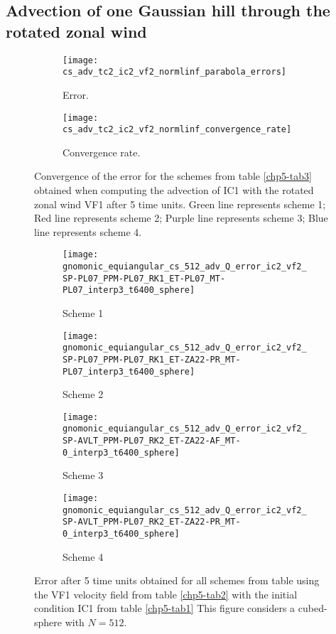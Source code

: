 \subsection{Advection of one Gaussian hill through the rotated zonal wind}
\begin{figure}[!htb]
	\centering
	\begin{subfigure}{0.42\textwidth}
		\centering
		\texttt{[image: cs\_adv\_tc2\_ic2\_vf2\_normlinf\_parabola\_errors]}
		\caption{Error.\label{chp5-adv1-error}}
	\end{subfigure}
	\begin{subfigure}{0.42\textwidth}
		\centering
		\texttt{[image: cs\_adv\_tc2\_ic2\_vf2\_normlinf\_convergence\_rate]}
		\caption{Convergence rate.\label{chp5-adv1-cr}}
	\end{subfigure}
	\caption{Convergence of the error for the schemes from table \ref{chp5-tab3} obtained when computing the advection of IC1  with the rotated zonal wind VF1 after 5 time units.
	Green line represents scheme 1;
	Red line represents scheme 2;
	Purple line represents scheme 3;
	Blue line represents scheme 4.
	\label{chp5-error-adv1}}
\end{figure}

\begin{figure}[!htb]
	\centering
	\begin{subfigure}{0.3\textwidth}
		\centering
		\texttt{[image: gnomonic\_equiangular\_cs\_512\_adv\_Q\_error\_ic2\_vf2\_SP-PL07\_PPM-PL07\_RK1\_ET-PL07\_MT-PL07\_interp3\_t6400\_sphere]}
		\caption{Scheme 1 \label{chp5-adv1-s1}}
	\end{subfigure}
	\begin{subfigure}{0.3\textwidth}
		\centering
		\texttt{[image: gnomonic\_equiangular\_cs\_512\_adv\_Q\_error\_ic2\_vf2\_SP-PL07\_PPM-PL07\_RK1\_ET-ZA22-PR\_MT-PL07\_interp3\_t6400\_sphere]}
		\caption{Scheme 2 \label{chp5-adv1-s2}}
	\end{subfigure}

	\begin{subfigure}{0.3\textwidth}
	\centering
	\texttt{[image: gnomonic\_equiangular\_cs\_512\_adv\_Q\_error\_ic2\_vf2\_SP-AVLT\_PPM-PL07\_RK2\_ET-ZA22-AF\_MT-0\_interp3\_t6400\_sphere]}
	\caption{Scheme 3 \label{chp5-adv1-s3}}
\end{subfigure}
\begin{subfigure}{0.3\textwidth}
	\centering
	\texttt{[image: gnomonic\_equiangular\_cs\_512\_adv\_Q\_error\_ic2\_vf2\_SP-AVLT\_PPM-PL07\_RK2\_ET-ZA22-PR\_MT-0\_interp3\_t6400\_sphere]}
	\caption{Scheme 4 \label{chp5-adv1-s4}}
\end{subfigure}
	\caption{ Error after 5 time units obtained for all schemes from table using the VF1 velocity field from table \ref{chp5-tab2} with the initial condition IC1 from  table \ref{chp5-tab1} 
		This figure considers a cubed-sphere with $N=512$. \label{chp5-adv1}}
\end{figure}

